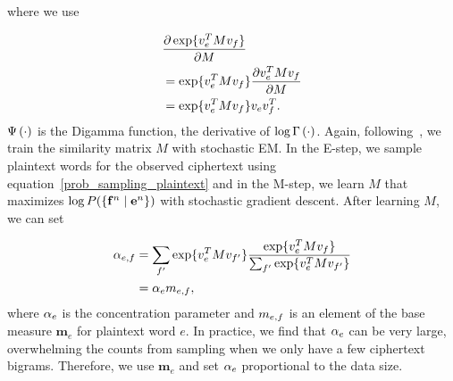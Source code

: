 where we use 

\begin{align}
& \frac{\partial  \exp \{ v_{e}^ T M  v_{f} \} }{\partial M} \notag \\
& = \exp \{ v_{e}^ T M  v_{f} \} \frac{\partial  v_{e}^T M  v_{f} }{\partial M} \notag \\
& = \exp \{ v_{e}^ T M  v_{f} \} v_{e} v_{f}^T \notag.
\end{align}
$\Psi \left( \cdot \right)$ is the Digamma function, the derivative of $\log \Gamma \left( \cdot \right)$. Again, following~, we train the similarity matrix $M$ with stochastic EM. In the E-step, we sample plaintext words for the observed ciphertext using equation~\ref{prob_sampling_plaintext} and in the M-step, we learn $M$ that maximizes $\log P( \{ \mathbf{f}^n \mid \mathbf{e}^n \})$ with stochastic gradient descent. After learning $M$, we can set 

\begin{align}
\alpha_{e,f} &= \sum_{f'} \exp \{ v_{e}^T  M  v_{f'} \} \frac{\exp \{ v_{e}^T  M  v_{f} \}} {\sum_{f'} \exp \{ v_{e}^T  M  v_{f'} \} } \notag \\
                                    & = \alpha_{e} m_{e,f} \label{base-concentration}, 
\end{align}
where $\alpha_{e}$ is the concentration parameter and $m_{e,f}$ is an element of the base measure $\mathbf{m}_e$ for plaintext word $e$. In practice, we find that $\alpha_{e}$ can be very large, overwhelming the counts from sampling when we only have a few ciphertext bigrams. Therefore, we use $\mathbf{m}_e$ and set $\alpha_{e}$ proportional to the data size. 

\iffalse
we will first derive the complete data log-likelihood for our model and then present the steps of our stochastic EM algorithm. For a particular ciphertext and plaintext bigram, For an english word $\word{e}$, 

We adopt the approach based on word context similarities to learn a better base distribution. However, our work is different from previous approach in the following ways: First, our work does not rely on any seed lexicon to learn the mapping between word context vectors, rather, it uses the results from sampling. Second, the mapping is not always fixed, but becomes better as the sampling process progresses. Last, but not least, the base distribution derived from the mapping and word contexts is used to improve decipherment.
\fi